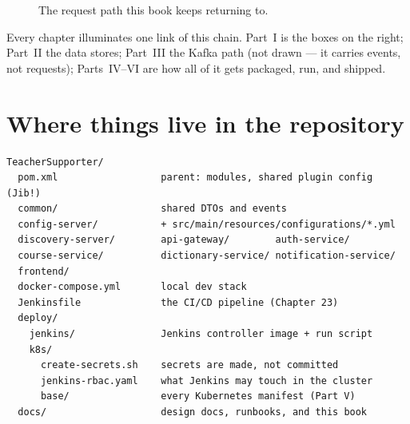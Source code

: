 \begin{figure}[h]
\centering
{}
\caption{The request path this book keeps returning to.}
\end{figure}

Every chapter illuminates one link of this chain. Part~I is the boxes on
the right; Part~II the data stores; Part~III the Kafka path (not drawn ---
it carries events, not requests); Parts~IV--VI are how all of it gets
packaged, run, and shipped.

\section*{Where things live in the repository}

\begin{lstlisting}
TeacherSupporter/
  pom.xml                  parent: modules, shared plugin config (Jib!)
  common/                  shared DTOs and events
  config-server/           + src/main/resources/configurations/*.yml
  discovery-server/        api-gateway/        auth-service/
  course-service/          dictionary-service/ notification-service/
  frontend/
  docker-compose.yml       local dev stack
  Jenkinsfile              the CI/CD pipeline (Chapter 23)
  deploy/
    jenkins/               Jenkins controller image + run script
    k8s/
      create-secrets.sh    secrets are made, not committed
      jenkins-rbac.yaml    what Jenkins may touch in the cluster
      base/                every Kubernetes manifest (Part V)
  docs/                    design docs, runbooks, and this book
\end{lstlisting}

